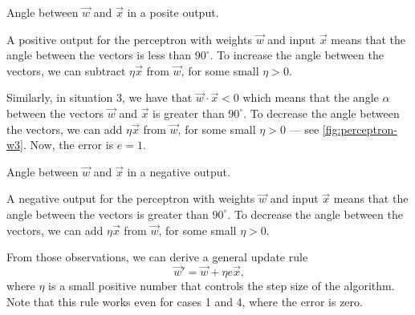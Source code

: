 \begin{figurebox}[label=fig:perceptron-w2]{Angle between $\vec{w}$ and $\vec{x}$ in a posite output.}
  \centering
  \tcblower
  A positive output for the perceptron with weights $\vec{w}$ and input $\vec{x}$ means
  that the angle between the vectors is less than $90^\circ$.  To increase the angle
  between the vectors, we can subtract $\eta\vec{x}$ from $\vec{w}$, for some small $\eta
  > 0$.
\end{figurebox}

Similarly, in situation 3, we have that $\vec{w} \cdot \vec{x} < 0$ which means that the
angle $\alpha$ between the vectors $\vec{w}$ and $\vec{x}$ is greater than $90^\circ$.
To decrease the angle between the vectors, we can add $\eta\vec{x}$ from $\vec{w}$, for
some small $\eta > 0$ --- see \cref{fig:perceptron-w3}.  Now, the error is $e = 1$.

\begin{figurebox}[label=fig:perceptron-w3]{Angle between $\vec{w}$ and $\vec{x}$ in a negative output.}
  \centering
  \tcblower
  A negative output for the perceptron with weights $\vec{w}$ and input $\vec{x}$ means
  that the angle between the vectors is greater than $90^\circ$.  To decrease the angle
  between the vectors, we can add $\eta\vec{x}$ from $\vec{w}$, for some small $\eta
  > 0$.
\end{figurebox}

From those observations, we can derive a general update rule
\[
  \vec{w}' = \vec{w} + \eta e \vec{x}\text{,}
\]
where $\eta$ is a small positive number that controls the step size of the algorithm.
Note that this rule works even for cases 1 and 4, where the error is zero.

